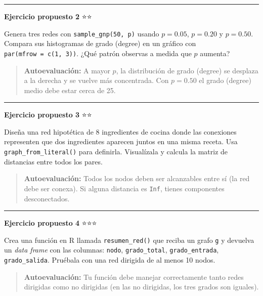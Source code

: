 \documentclass[
  letterpaper,
  DIV=11,
  numbers=noendperiod]{scrreprt}
\begin{document}
\begin{center}\rule{0.5\linewidth}{0.5pt}\end{center}

\textbf{Ejercicio propuesto 2} ⭐⭐

Genera tres redes con \texttt{sample\_gnp(50,\ p)} usando \(p = 0.05\),
\(p = 0.20\) y \(p = 0.50\). Compara sus histogramas de grado (degree)
en un gráfico con \texttt{par(mfrow\ =\ c(1,\ 3))}. ¿Qué patrón observas
a medida que \(p\) aumenta?

\begin{quote}
\textbf{Autoevaluación:} A mayor \(p\), la distribución de grado
(degree) se desplaza a la derecha y se vuelve más concentrada. Con
\(p = 0.50\) el grado (degree) medio debe estar cerca de 25.
\end{quote}

\begin{center}\rule{0.5\linewidth}{0.5pt}\end{center}

\textbf{Ejercicio propuesto 3} ⭐⭐

Diseña una red hipotética de 8 ingredientes de cocina donde las
conexiones representen que dos ingredientes aparecen juntos en una misma
receta. Usa \texttt{graph\_from\_literal()} para definirla. Visualízala
y calcula la matriz de distancias entre todos los pares.

\begin{quote}
\textbf{Autoevaluación:} Todos los nodos deben ser alcanzables entre sí
(la red debe ser conexa). Si alguna distancia es \texttt{Inf}, tienes
componentes desconectados.
\end{quote}

\begin{center}\rule{0.5\linewidth}{0.5pt}\end{center}

\textbf{Ejercicio propuesto 4} ⭐⭐⭐

Crea una función en R llamada \texttt{resumen\_red()} que reciba un
grafo \texttt{g} y devuelva un \emph{data frame} con las columnas:
\texttt{nodo}, \texttt{grado\_total}, \texttt{grado\_entrada},
\texttt{grado\_salida}. Pruébala con una red dirigida de al menos 10
nodos.

\begin{quote}
\textbf{Autoevaluación:} Tu función debe manejar correctamente tanto
redes dirigidas como no dirigidas (en las no dirigidas, los tres grados
son iguales).
\end{quote}
\end{document}
